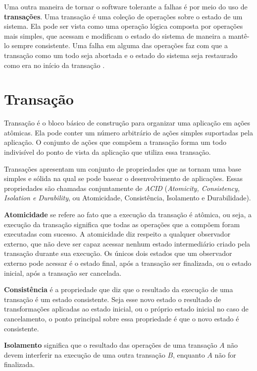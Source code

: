 \documentclass[11pt,twoside,a4paper]{book}
\begin{document}
Uma outra maneira de tornar o software tolerante a falhas é por meio do uso de \textbf{transações}. Uma transação é uma coleção de operações sobre o estado de um sistema. Ela pode ser vista como uma operação lógica composta por operações mais simples, que acessam e modificam o estado do sistema de maneira a mantê-lo sempre consistente. Uma falha em alguma das operações faz com que a transação como um todo seja abortada e o estado do sistema seja restaurado como era no início da transação \cite{garcia-molina, vaca, gray}.

\section{Transação}
\label{sec:transacao}
Transação é o bloco básico de construção para organizar uma aplicação em ações atômicas. Ela pode conter um número arbitrário de ações simples suportadas pela aplicação. O conjunto de ações que compõem a transação forma um todo indivisível do ponto de vista da aplicação que utiliza essa transação.

Transações apresentam um conjunto de propriedades que as tornam uma base simples e sólida na qual se pode basear o desenvolvimento de aplicações. Essas propriedades são chamadas conjuntamente de \emph{ACID} (\emph{Atomicity, Consistency, Isolation e Durability}, ou Atomicidade, Consistência, Isolamento e Durabilidade). 

\textbf{Atomicidade} se refere ao fato que a execução da transação é atômica, ou seja, a execução da transação significa que todas as operações que a compõem foram executadas com sucesso. A atomicidade diz respeito a qualquer observador externo, que não deve ser capaz acessar nenhum estado intermediário criado pela transação durante sua execução. Os únicos dois estados que um observador externo pode acessar é o estado final, após a transação ser finalizada, ou o estado inicial, após a transação ser cancelada.

\textbf{Consistência} é a propriedade que diz que o resultado da execução de uma transação é um estado consistente. Seja esse novo estado o resultado de transformações aplicadas ao estado inicial, ou o próprio estado inicial no caso de cancelamento, o ponto principal sobre essa propriedade é que o novo estado é consistente.

\textbf{Isolamento} significa que o resultado das operações de uma transação $A$ não devem interferir na execução de uma outra transação $B$, enquanto $A$ não for finalizada.
\end{document}
